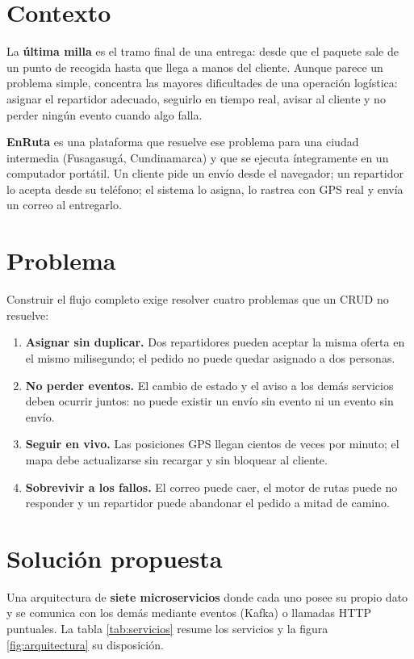 \documentclass[10pt,letterpaper,twocolumn,oneside]{report}
\begin{document}
\section{Contexto}

La \textbf{última milla} es el tramo final de una entrega: desde que el paquete sale de un punto
de recogida hasta que llega a manos del cliente. Aunque parece un problema simple, concentra las
mayores dificultades de una operación logística: asignar el repartidor adecuado, seguirlo en
tiempo real, avisar al cliente y no perder ningún evento cuando algo falla.

\textbf{EnRuta} es una plataforma que resuelve ese problema para una ciudad intermedia
(Fusagasugá, Cundinamarca) y que se ejecuta íntegramente en un computador portátil. Un cliente
pide un envío desde el navegador; un repartidor lo acepta desde su teléfono; el sistema lo asigna,
lo rastrea con GPS real y envía un correo al entregarlo.

\section{Problema}

Construir el flujo completo exige resolver cuatro problemas que un CRUD no resuelve:

\begin{enumerate}[leftmargin=1.2cm]
  \item \textbf{Asignar sin duplicar.} Dos repartidores pueden aceptar la misma oferta en el
        mismo milisegundo; el pedido no puede quedar asignado a dos personas.
  \item \textbf{No perder eventos.} El cambio de estado y el aviso a los demás servicios deben
        ocurrir juntos: no puede existir un envío sin evento ni un evento sin envío.
  \item \textbf{Seguir en vivo.} Las posiciones GPS llegan cientos de veces por minuto; el mapa
        debe actualizarse sin recargar y sin bloquear al cliente.
  \item \textbf{Sobrevivir a los fallos.} El correo puede caer, el motor de rutas puede no
        responder y un repartidor puede abandonar el pedido a mitad de camino.
\end{enumerate}

\section{Solución propuesta}

Una arquitectura de \textbf{siete microservicios} donde cada uno posee su propio dato y se
comunica con los demás mediante eventos (Kafka) o llamadas HTTP puntuales. La tabla
\ref{tab:servicios} resume los servicios y la figura \ref{fig:arquitectura} su disposición.
\end{document}
